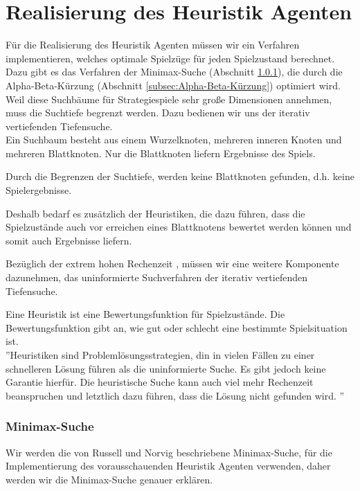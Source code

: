 \chapter{Realisierung des Heuristik Agenten}
\label{cha:Realisierung des Heuristik Agenten}

Für die Realisierung des Heuristik Agenten müssen wir ein Verfahren implementieren, welches optimale Spielzüge für jeden Spielzustand berechnet. \\

Dazu gibt es das Verfahren der Minimax-Suche (Abschnitt \ref{subsec:Minimax}), die durch die Alpha-Beta-Kürzung (Abschnitt \ref{subsec:Alpha-Beta-Kürzung}) optimiert wird. \\

Weil diese Suchbäume für Strategiespiele sehr große Dimensionen annehmen, 
muss die Suchtiefe begrenzt werden. Dazu bedienen wir uns der iterativ vertiefenden Tiefensuche. \\

Ein Suchbaum besteht aus einem Wurzelknoten, mehreren inneren Knoten und mehreren Blattknoten. Nur die Blattknoten liefern Ergebnisse des Spiels.


Durch die Begrenzen der Suchtiefe, werden keine Blattknoten gefunden, d.h. keine Spielergebnisse.

Deshalb bedarf es zusätzlich der Heuristiken, die dazu führen, dass die Spielzustände auch vor erreichen eines Blattknotens bewertet werden können und somit auch Ergebnisse liefern.  

  


Bezüglich der extrem hohen Rechenzeit , müssen wir eine weitere Komponente dazunehmen, das uninformierte Suchverfahren der iterativ vertiefenden Tiefensuche.

Eine Heuristik ist eine Bewertungsfunktion für Spielzustände. Die Bewertungsfunktion gibt an, wie gut oder schlecht eine bestimmte Spielsituation ist. \\

''Heuristiken sind Problemlösungsstrategien, din in vielen Fällen zu einer schnelleren Lösung führen als die uninformierte Suche. Es gibt jedoch keine Garantie hierfür. Die heuristische Suche kann auch viel mehr Rechenzeit beanspruchen und letztlich dazu führen, dass die Lösung nicht gefunden wird.  \cite[105]{Ertel}''\\

\subsection{Minimax-Suche}
\label{subsec:Minimax}
Wir werden die von Russell und Norvig beschriebene Minimax-Suche, für die Implementierung des vorausschauenden Heuristik Agenten verwenden, daher werden wir die Minimax-Suche genauer erklären. \\

